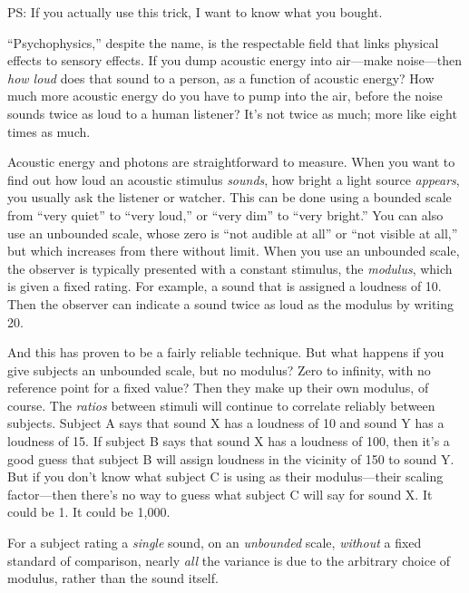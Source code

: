 {
 PS: If you actually use this trick, I want to know what you
bought.}

\myendsectiontext


\bigskip


{
 ``Psychophysics,'' despite the
name, is the respectable field that links physical effects to sensory
effects. If you dump acoustic energy into air---make noise---then
\textit{how loud} does that sound to a person, as a function of
acoustic energy? How much more acoustic energy do you have to pump into
the air, before the noise sounds twice as loud to a human listener?
It's not twice as much; more like eight times as much.
}

{
 Acoustic energy and photons are straightforward to measure. When
you want to find out how loud an acoustic stimulus \textit{sounds}, how
bright a light source \textit{appears}, you usually ask the listener or
watcher. This can be done using a bounded scale from
``very quiet'' to
``very loud,'' or
``very dim'' to
``very bright.'' You can also use an
unbounded scale, whose zero is ``not audible at
all'' or ``not visible at
all,'' but which increases from there without limit.
When you use an unbounded scale, the observer is typically presented
with a constant stimulus, the \textit{modulus}, which is given a fixed
rating. For example, a sound that is assigned a loudness of 10. Then
the observer can indicate a sound twice as loud as the modulus by
writing 20.}

{
 And this has proven to be a fairly reliable technique. But what
happens if you give subjects an unbounded scale, but no modulus? Zero
to infinity, with no reference point for a fixed value? Then they make
up their own modulus, of course. The \textit{ratios} between stimuli
will continue to correlate reliably between subjects. Subject A says
that sound X has a loudness of 10 and sound Y has a loudness of 15. If
subject B says that sound X has a loudness of 100, then
it's a good guess that subject B will assign loudness
in the vicinity of 150 to sound Y. But if you don't
know what subject C is using as their modulus---their scaling
factor---then there's no way to guess what subject C
will say for sound X. It could be 1. It could be 1,000.}

{
 For a subject rating a \textit{single} sound, on an
\textit{unbounded} scale, \textit{without} a fixed standard of
comparison, nearly \textit{all} the variance is due to the arbitrary
choice of modulus, rather than the sound itself.}


